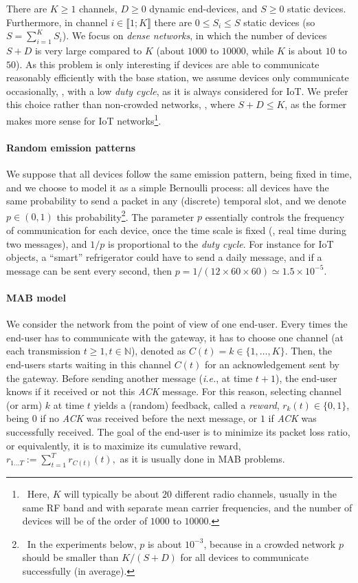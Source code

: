 There are $K \geq 1$ channels, $D \geq 0$ dynamic end-devices, and $S \geq 0$ static devices.
Furthermore, in channel $i \in \llbracket 1; K \rrbracket$ there are $0 \leq S_i \leq S$ static devices (so $S = \sum_{i=1}^{K} S_i$).
We focus on \emph{dense networks}, in which the number of devices $S + D$ is very large compared to $K$ (about $1000$ to $10000$, while $K$ is about $10$ to $50$).
As this problem is only interesting if devices are able to communicate reasonably efficiently with the base station, we assume devices only communicate occasionally, \ie, with a low \emph{duty cycle}, as it is always considered for IoT.
We prefer this choice rather than non-crowded networks, \ie, where $S + D \leq K$, as the former makes more sense for IoT networks\footnote{~Here, $K$ will typically be about $20$ different radio channels, usually in the same RF band and with separate mean carrier frequencies, and the number of devices will be of the order of $1000$ to $10000$.}.


\paragraph{Random emission patterns}
%
We suppose that all devices follow the same emission pattern, being fixed in time, and we choose to model it as a simple Bernoulli process:
all devices have the same probability to send a packet in any (discrete) temporal slot, and we denote $p \in (0, 1)$ this probability\footnote{~In the experiments below, $p$ is about $10^{-3}$, because in a crowded network $p$ should be smaller than $K / (S + D)$ for all devices to communicate successfully (in average).}.
The parameter $p$ essentially controls the frequency of communication for each device, once the time scale is fixed (\ie, real time during two messages), and $1/p$ is proportional to the \emph{duty cycle}.
For instance for IoT objects, a ``smart'' refrigerator could have to send a daily message, and if a message can be sent every second, then $p = 1 / (12 \times 60 \times 60) \simeq 1.5 \times 10^{-5}$.


\paragraph{MAB model}

We consider the network from the point of view of one end-user. Every times the end-user has to communicate with the gateway,
it has to choose one channel (at each transmission $t \geq 1, t \in \mathbb{N}$), denoted as $C(t) = k \in\{1,\dots,K\}$.
Then, the end-users starts waiting in this channel $C(t)$ for an acknowledgement sent by the gateway.
Before sending another message (\emph{i.e.}, at time $t+1$), the end-user knows if it received or not this \emph{ACK} message.
%
For this reason, selecting channel (or arm) $k$ at time $t$ yields a (random) feedback, called a \emph{reward}, $r_k(t) \in \{0,1\}$, being $0$ if no \emph{ACK} was received before the next message, or $1$ if \emph{ACK} was successfully received.
The goal of the end-user is to minimize its packet loss ratio, or equivalently, it is to maximize its cumulative reward,
$r_{1 \dots T} := \sum_{t = 1}^T r_{C(t)}(t),$
as it is usually done in MAB problems.



